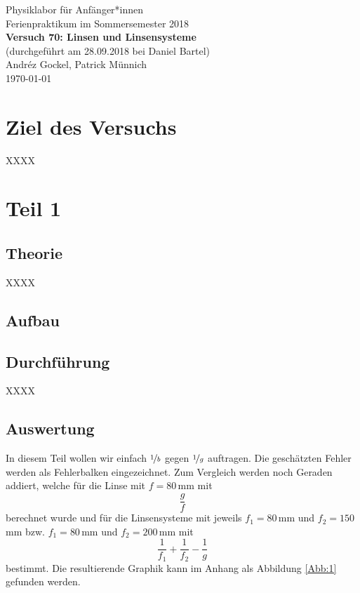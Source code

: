 \documentclass[11pt,a4paper]{article}
\newcommand{\halftime}[4]{\begin{figure}[h]
\begin{minipage}{.#1\textwidth}#3\end{minipage}\begin{minipage}{.#2\textwidth}
\centering
#4\end{minipage}
\end{figure}}
\begin{document}
{
\centering 
\large 
Physiklabor für Anf\"anger*innen \\
Ferienpraktikum im Sommersemester 2018 \\[4mm]
\textbf{\LARGE 
Versuch 70: Linsen und Linsensysteme
} \\[3mm]
(durchgef\"uhrt am 28.09.2018 bei Daniel Bartel) \\
Andréz Gockel, Patrick M\"unnich\\
\today \\[10mm]
}

\vspace{50pt}
\tableofcontents
\vspace{22pt}
\listoftables
\vspace{22pt}
\listoffigures
\pagebreak

\section{Ziel des Versuchs}
XXXX
\section{Teil 1}

\subsection{Theorie}

XXXX

\subsection{Aufbau}



\subsection{Durchführung}

XXXX

\subsection{Auswertung}

In diesem Teil wollen wir einfach $\nicefrac{1}{b}$ gegen $\nicefrac{1}{g}$ auftragen. Die gesch\"atzten Fehler werden als Fehlerbalken eingezeichnet. Zum Vergleich werden noch Geraden addiert, welche f\"ur die Linse mit $f=80\,$mm mit
\[
\frac{g}{f}
\]
berechnet wurde und f\"ur die Linsensysteme mit jeweils $f_1=80\,$mm und $f_2=150\,$mm bzw. $f_1=80\,$mm und $f_2=200\,$mm mit
\[
\frac{1}{f_1}+\frac{1}{f_2}-\frac{1}{g}
\]
bestimmt. Die resultierende Graphik kann im Anhang als Abbildung \ref{Abb:1} gefunden werden.
\end{document}
